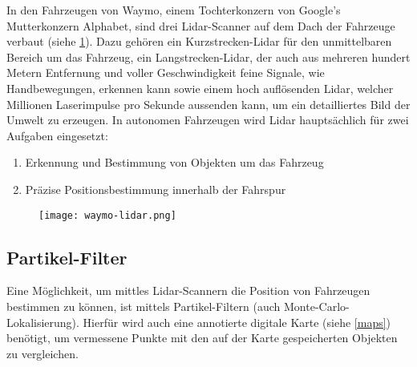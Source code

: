 In den Fahrzeugen von Waymo, einem Tochterkonzern von Google's Mutterkonzern Alphabet, sind drei \acs{Lidar}-Scanner auf dem Dach der Fahrzeuge verbaut (siehe \ref{waymo-lidar}). Dazu gehören ein Kurzstrecken-\acs{Lidar} für den unmittelbaren Bereich um das Fahrzeug, ein Langstrecken-\acs{Lidar}, der auch aus mehreren hundert Metern Entfernung und voller Geschwindigkeit feine Signale, wie Handbewegungen, erkennen kann sowie einem hoch auflösenden \acs{Lidar}, welcher Millionen Laserimpulse pro Sekunde aussenden kann, um ein detailliertes Bild der Umwelt zu erzeugen.  In autonomen Fahrzeugen wird \acs{Lidar} hauptsächlich für zwei Aufgaben eingesetzt:
\begin{enumerate}
  \item{Erkennung und Bestimmung von Objekten um das Fahrzeug}
  \item{Präzise Positionsbestimmung innerhalb der Fahrspur}
\end{enumerate}

\begin{figure}\centering
  \texttt{[image: waymo-lidar.png]}
  \label{waymo-lidar}
\end{figure}

\subsection{Partikel-Filter}

Eine Möglichkeit, um mittles \acs{Lidar}-Scannern die Position von Fahrzeugen bestimmen zu können, ist mittels Partikel-Filtern (auch Monte-Carlo-Lokalisierung). Hierfür wird auch eine annotierte digitale Karte (siehe \ref{maps}) benötigt, um vermessene Punkte mit den auf der Karte gespeicherten Objekten zu vergleichen.

